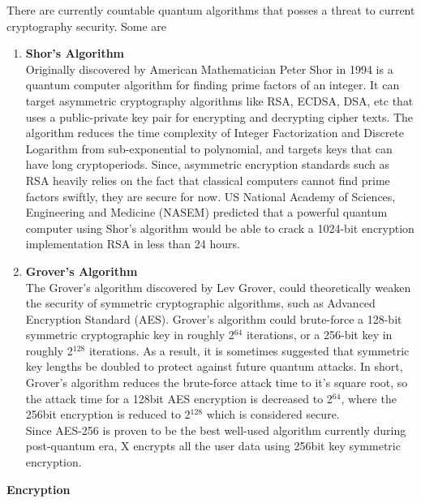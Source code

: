 \documentclass[letterpaper,11pt]{article}
\begin{document}
There are currently countable quantum algorithms that posses a threat to current cryptography security. Some are
\begin{enumerate}[wide, labelwidth=!, labelindent=0pt]
\item \textbf{Shor's Algorithm}\\

Originally discovered by American Mathematician Peter Shor in 1994 is a quantum computer algorithm for finding prime factors of an integer. It can target asymmetric cryptography algorithms like RSA, ECDSA, DSA, etc that uses a public-private key pair for encrypting and decrypting cipher texts. The algorithm reduces the time complexity of Integer Factorization and Discrete Logarithm from sub-exponential to polynomial, and targets keys that can have long cryptoperiods. Since, asymmetric encryption standards such as RSA heavily relies on the fact that classical computers cannot find prime factors swiftly, they are secure for now. US National Academy of Sciences, Engineering and Medicine (NASEM) predicted that a powerful quantum computer using Shor’s algorithm would be able to crack a 1024-bit encryption implementation RSA in less than 24 hours.\\

\item \textbf{Grover's Algorithm}\\

The Grover's algorithm discovered by Lev Grover, could theoretically weaken the security of symmetric cryptographic algorithms, such as Advanced Encryption Standard (AES). Grover's algorithm could brute-force a 128-bit symmetric cryptographic key in roughly 2$^{64}$ iterations, or a 256-bit key in roughly 2$^{128}$ iterations. As a result, it is sometimes suggested that symmetric key lengths be doubled to protect against future quantum attacks.  In short, Grover's algorithm reduces the brute-force attack time to it's square root, so the attack time for a 128bit AES encryption is decreased to 2$^{64}$, where the 256bit encryption is reduced to 2$^{128}$ which is considered secure.\\

Since AES-256 is proven to be the best well-used algorithm currently during post-quantum era, X encrypts all the user data using 256bit key symmetric encryption. \\
\end{enumerate}

\textbf{Encryption}\\
\end{document}
